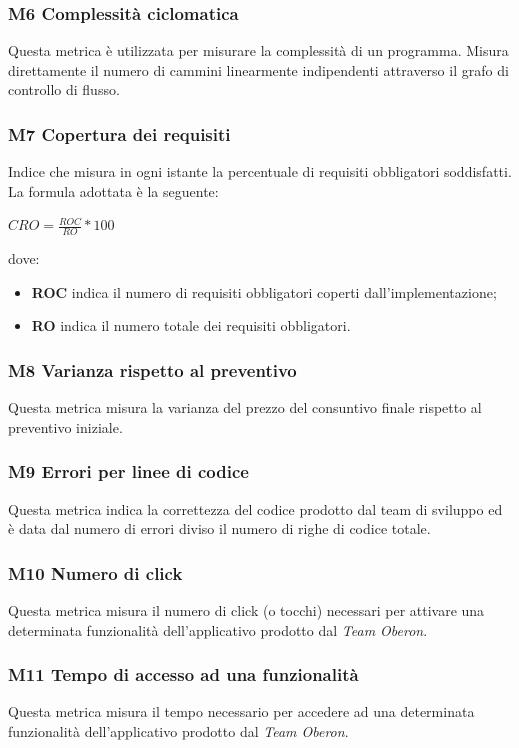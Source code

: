 \subsubsection{M6 Complessità ciclomatica}
Questa metrica è utilizzata per misurare la complessità di un programma. Misura direttamente il numero di cammini linearmente indipendenti attraverso il grafo di controllo di flusso.
\subsubsection{M7 Copertura dei requisiti}
Indice che misura in ogni istante la percentuale di requisiti obbligatori soddisfatti. La formula adottata è la seguente:
\begin{center}
    \begin{math}
        CRO = \frac{ROC}{RO} *100
    \end{math}
\end{center}
dove:
\begin{itemize}
    \item \textbf{ROC} indica il numero di requisiti obbligatori coperti dall’implementazione;
    \item \textbf{RO} indica il numero totale dei requisiti obbligatori.
\end{itemize}
\subsubsection{M8 Varianza rispetto al preventivo}
Questa metrica misura la varianza del prezzo del consuntivo finale rispetto al preventivo iniziale.
\subsubsection{M9 Errori per linee di codice}
Questa metrica indica la correttezza del codice prodotto dal team di sviluppo ed è data dal numero di errori diviso il numero di righe di codice totale.
\subsubsection{M10 Numero di click}
Questa metrica misura il numero di click (o tocchi) necessari per attivare una determinata funzionalità dell'applicativo prodotto dal \textit{Team Oberon}.
\subsubsection{M11 Tempo di accesso ad una funzionalità}
Questa metrica misura il tempo necessario per accedere ad una determinata funzionalità dell'applicativo prodotto dal \textit{Team Oberon}.
